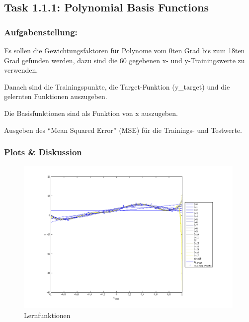 \subsection{Task 1.1.1: Polynomial Basis Functions}

\subsubsection{Aufgabenstellung:}


Es sollen die Gewichtungsfaktoren für Polynome vom 0ten Grad bis zum 18ten Grad gefunden werden, dazu sind die 60 gegebenen x- und y-Trainingswerte zu verwenden.

Danach sind die Trainingspunkte, die Target-Funktion (y\_target) und die gelernten Funktionen auszugeben.

Die Basisfunktionen sind als Funktion von x auszugeben.

Ausgeben des ``Mean Squared Error'' (MSE) für die Trainings- und Testwerte.


\subsubsection{Plots \& Diskussion}

\begin{figure}[hp!]
\begin{center}
 \includegraphics[width=0.99\textwidth]{./figures/1_1_1_unscaled_learn_fct}
 \caption[Lernfunktionen]{Lernfunktionen}
\label{fig:unscaled_learn_fct}
\end{center}
\end{figure}


